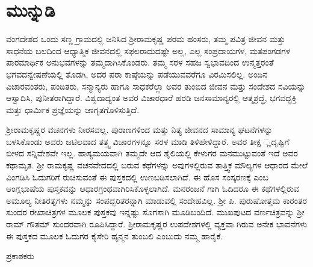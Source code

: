 
\chapter*{ಮುನ್ನುಡಿ}

ವಂಗದೇಶದ ಒಂದು ಸಣ್ಣ ಗ್ರಾಮದಲ್ಲಿ ಜನಿಸಿದ ಶ್ರೀರಾಮಕೃಷ್ಣ ಪರಮ ಹಂಸರು, ತಮ್ಮ ಪವಿತ್ರ ಜೀವನ ಮತ್ತು ಸಾಧನೆಯ ಬಲದಿಂದ ಆಧ್ಯಾತ್ಮಿಕ ಜೀವನದಲ್ಲಿ ಸಫಲರಾದುದಷ್ಟೇ ಅಲ್ಲ, ಎಲ್ಲ ಸಂಪ್ರದಾಯಗಳ, ಮತಪಂಗಡಗಳ ಪಾರಮಾರ್ಥಿಕ ಅನುಭವಗಳನ್ನು ತಮ್ಮದಾಗಿಸಿಕೊಂಡರು. ತಮ್ಮ ಸರಳ ಸಹಜ ಸ್ವಭಾವದಿಂದ ಉನ್ಮತ್ತರಂತೆ ಭಗವದನ್ವೇಷಣೆಯಲ್ಲಿ ತೊಡಗಿ, ಅದರ ಪರಾ ಕಾಷ್ಠೆಯನ್ನು ಪಡೆಯುವವರೆಗೂ ವಿರಮಿಸಲಿಲ್ಲ. ಅಂದಿನ ವಿಚಾರವಂತರು, ಪಂಡಿತರು, ಸನ್ಮಾನ್ಯರು ಹಾಗೂ ಸಾಧಕರೆಲ್ಲಾ ಅವರ ತುಂಬಿದ ಜೀವನ ಮತ್ತು ಸಂದೇಶದ ಸವಿಯನ್ನು ಆಸ್ವಾದಿಸಿ, ಪುನೀತರಾಗಿದ್ದಾರೆ. ವಿಶ್ವದಾದ್ಯಂತ ಅವರ ವಿಚಾರಧಾರೆ ಹರಡಿ ಜನಸಾಮಾನ್ಯರಲ್ಲಿ ಆತ್ಮಶ್ರದ್ಧೆ, ಭಗವದ್ಭಕ್ತಿ ಮತ್ತು ಧಾರ್ಮಿಕ ಪ್ರಜ್ಞೆಯನ್ನು ಜಾಗೃತಗೊಳಿಸುತ್ತಿದೆ.

ಶ್ರೀರಾಮಕೃಷ್ಣರ ವಚನಗಳು ನೀರಸವಲ್ಲ. ಪುರಾಣಗಳಿಂದ ಮತ್ತು ನಿತ್ಯ ಜೀವನದ ಸಾಮಾನ್ಯ ಘಟನೆಗಳನ್ನು ಬಳಸಿಕೊಂಡು ಅವರು ಜಟಿಲವಾದ ತತ್ತ್ವ ವಿಚಾರಗಳನ್ನೂ ಸರಳ ಮಾಡಿ ತಿಳಿಹೇಳಿದ್ದಾರೆ. ಅವರ ತೀಕ್ಷ ್ಣದೃಷ್ಟಿಗೆ ಬೀಳದ ಸನ್ನಿವೇಶವೇ ಇಲ್ಲ. ಹಾಸ್ಯಮಯವಾಗಿ ತಮ್ಮದೇ ಆದ ಶೈಲಿಯಲ್ಲಿ ಕೇಳುಗರ ಮನಮುಟ್ಟುವಂತೆ ಇದೆ ಅವರ ಕಥಾಮೃತ. ಶ್ರೀ ರಾಮಕೃಷ್ಣ ವಚನವೇದದಲ್ಲಿ ಬರುವ ಕಥೆಗಳನ್ನು ಅವುಗಳಲ್ಲಿರುವ ತಾತ್ತ್ವಿಕ ಮೌಲ್ಯಗಳ ಆಧಾರದ ಮೇಲೆ ವಿಂಗಡಿಸಿ ಓದುಗರಿಗೆ ರುಚಿಸುವಂತೆ ಈ ಪುಸ್ತಕದಲ್ಲಿ ಉಣಬಡಿಸಲಾಗಿದೆ. ಈ ಹೊಸ ಸಂಸ್ಕರಣಕ್ಕೆ  ಎಂಬ ಆಂಗ್ಲಭಾಷೆಯ ಪುಸ್ತಕವನ್ನು ಆಧಾರಗ್ರಂಥವಾಗಿರಿಸಿಕೊಳ್ಳಲಾಗಿದೆ. ಮನರಂಜನೆ ಗಾಗಿ ಓದಿದರೂ ಈ ಕಥೆಗಳಲ್ಲಿರುವ ಅಮೂಲ್ಯ ನೀತಿರತ್ನಗಳು ನಮ್ಮನ್ನು ಸಂಪದ್ಭರಿತರನ್ನಾಗಿ ಮಾಡುವಲ್ಲಿ ಸಂದೇಹವಿಲ್ಲ. ಶ್ರೀ ಪಿ. ಪುರುಷೋತ್ತಮ ಕಾರಂತರ ಸುಂದರ ರೇಖಾಚಿತ್ರಗಳ ಮೂಲಕ ಪುಸ್ತಕವು ಇನ್ನಷ್ಟು ಸೊಗಸಾಗಿ ಮೂಡಿಬಂದಿದೆ. ಮುಖಪುಟದ ವರ್ಣಚಿತ್ರವನ್ನು ಶ್ರೀ ರಾಮ್ ಗೌತಮ್ ಸುಂದರವಾಗಿ ರೂಪಿಸಿದ್ದಾರೆ. ಶ್ರೀರಾಮಕೃಷ್ಣರ ಉಪದೇಶಗಳಲ್ಲಿ ವ್ಯಕ್ತವಾ ಗಿರುವ ಅನೇಕ ಭಾವನೆಗಳು ಈ ಪುಸ್ತಕದ ಮೂಲಕ ಓದುಗರ ಕೈಸೇರಿ ಹೃನ್ಮನ ತುಂಬಲಿ ಎಂಬುದು ನಮ್ಮ ಹಾರೈಕೆ.

\begin{flushright}
ಪ್ರಕಾಶಕರು
\end{flushright}

